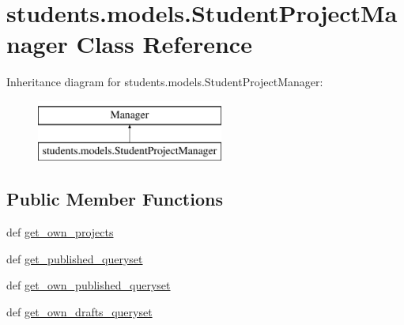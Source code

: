 \hypertarget{classstudents_1_1models_1_1_student_project_manager}{\section{students.\-models.\-Student\-Project\-Manager Class Reference}
\label{classstudents_1_1models_1_1_student_project_manager}
}
Inheritance diagram for students.\-models.\-Student\-Project\-Manager\-:\begin{figure}[H]
\begin{center}
\leavevmode
\includegraphics[height=2.000000cm]{classstudents_1_1models_1_1_student_project_manager}
\end{center}
\end{figure}
\subsection*{Public Member Functions}
\begin{DoxyCompactItemize}
\item 
def \hyperlink{classstudents_1_1models_1_1_student_project_manager_ad3c648c438aa4d5843bd6c126c392447}{get\-\_\-own\-\_\-projects}
\item 
def \hyperlink{classstudents_1_1models_1_1_student_project_manager_a03b6388a1e607fe19f5a936cc6413aa7}{get\-\_\-published\-\_\-queryset}
\item 
def \hyperlink{classstudents_1_1models_1_1_student_project_manager_aabfcebd98ffe329aa15c4776dea7ce95}{get\-\_\-own\-\_\-published\-\_\-queryset}
\item 
def \hyperlink{classstudents_1_1models_1_1_student_project_manager_abd14aa2f19159a52589e99a1efbdc28d}{get\-\_\-own\-\_\-drafts\-\_\-queryset}
\end{DoxyCompactItemize}



